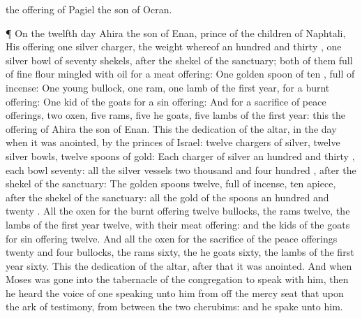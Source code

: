 {{} the
offering of
Pagiel the
son of
Ocran.
\par }{\PP {}¶ On the
twelfth
day
Ahira the
son of
Enan,
prince of the
children of
Naphtali,
{}
His
offering
{}
one
silver
charger, the
weight whereof
{} an
hundred and
thirty
{},
one
silver
bowl of
seventy
shekels, after the
shekel of the
sanctuary;
both of them
full of fine
flour
mingled with
oil for a meat
offering:
One
golden
spoon of
ten
{},
full of
incense:
One
young
bullock,
one
ram,
one
lamb of the
first
year, for a burnt
offering:
One
kid of the
goats for a sin
offering:
And for a
sacrifice of peace
offerings,
two
oxen,
five
rams,
five he
goats,
five
lambs of the
first
year: this
{} the
offering of
Ahira the
son of
Enan.
This
{} the
dedication of the
altar, in the
day when it was
anointed, by the
princes of
Israel:
twelve
chargers of
silver, twelve
silver
bowls,
twelve
spoons of
gold:
Each
charger of
silver
{} an
hundred and
thirty
{},
each
bowl
seventy: all the
silver
vessels
{} two
thousand and
four
hundred
{}, after the
shekel of the
sanctuary:
The
golden
spoons
{}
twelve,
full of
incense,
{}
ten
{}
apiece, after the
shekel of the
sanctuary: all the
gold of the
spoons
{} an
hundred and
twenty
{}.
All the
oxen for the burnt
offering
{}
twelve
bullocks, the
rams
twelve, the
lambs of the
first
year
twelve, with their meat
offering: and the
kids of the
goats for sin
offering
twelve.
And all the
oxen for the
sacrifice of the peace
offerings
{}
twenty and
four
bullocks, the
rams
sixty, the he
goats
sixty, the
lambs of the
first
year
sixty. This
{} the
dedication of the
altar,
after that it was
anointed.
And when
Moses was
gone into the
tabernacle of the
congregation to
speak with him, then he
heard the
voice of one
speaking unto him from off the mercy
seat that
{} upon the
ark of
testimony, from between the
two
cherubims: and he
spake unto him.

}
